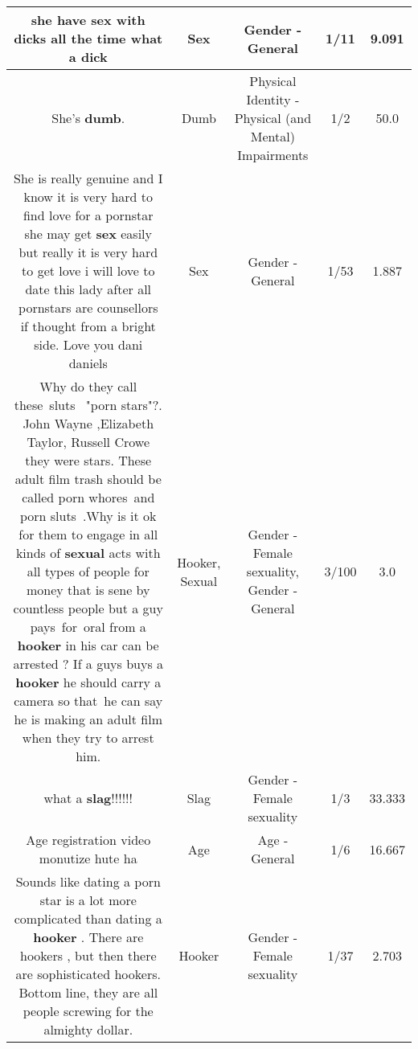 \documentclass[11pt]{article}
\newlength\mylength
\begin{document}
\begin{center}
\begin{longtable}{|C{.65\mylength}|C{.30\mylength}|C{.12\mylength}|C{.12\mylength}|C{.12\mylength}|}
  \small she have \textbf{sex} with dicks all the time  what a dick\normalsize   & Sex & Gender - General & 1/11 & 9.091 \\  \hline
  \small She's \textbf{dumb}.\normalsize   & Dumb & Physical Identity - Physical (and Mental) Impairments & 1/2 & 50.0 \\  \hline
  \small She is really genuine and I know it is very hard to find love for a pornstar she may get \textbf{sex} easily but really it is very hard to get love i will love to date this lady after all pornstars are counsellors if thought from a bright side. Love you dani daniels\normalsize   & Sex & Gender - General & 1/53 & 1.887 \\  \hline
  \small Why do they call these sluts  "porn stars"?. John Wayne ,Elizabeth Taylor, Russell Crowe they were stars. These adult film trash should be called porn whores and porn sluts .Why is it ok for them to engage in all kinds of \textbf{sexual} acts with all types of people for money that is sene by countless people but a guy pays for oral from a \textbf{hooker} in his car can be arrested ? If a guys buys a \textbf{hooker} he should carry a camera so that he can say he is making an adult film when they try to arrest him.\normalsize   & Hooker, Sexual & Gender - Female sexuality, Gender - General & 3/100 & 3.0 \\  \hline
  \small what a \textbf{slag}!!!!!!\normalsize   & Slag & Gender - Female sexuality & 1/3 & 33.333 \\  \hline
  \small Age registration video monutize hute ha\normalsize   & Age & Age - General & 1/6 & 16.667 \\  \hline
  \small Sounds like dating a porn star is a lot more complicated than dating a  \textbf{hooker} . There are hookers , but then there are sophisticated hookers. Bottom line, they are all people screwing for the almighty dollar.\normalsize   & Hooker & Gender - Female sexuality & 1/37 & 2.703 \\  \hline

\end{longtable}
\end{center}
\end{document}

